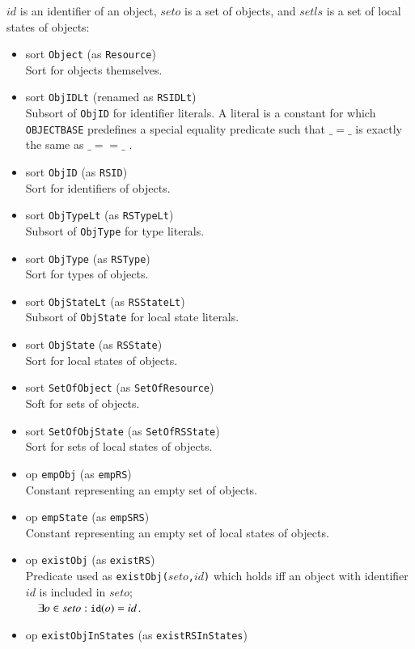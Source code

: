 \documentclass[12pt]{report}
\newcommand{\mbstt}[1]{\mbox{\small{\tt {#1}}}}
\newcommand{\stt}[1]{{\small{\tt {#1}}}}
\begin{document}
$id$ is an identifier of an object, $seto$ is a set of objects, and
$setls$ is a set of local states of objects:
\begin{itemize}
\item sort \stt{Object} (as \stt{Resource})\\
  Sort for objects themselves.
\item sort \stt{ObjIDLt} (renamed as \stt{RSIDLt})\\
  Subsort of {\tt ObjID} for identifier literals. A literal is a
  constant for which {\tt OBJECTBASE} predefines a special equality
  predicate such that $\_ = \_$ is exactly the same as $\_ == \_ $ .
\item sort \stt{ObjID} (as \stt{RSID})\\
  Sort for identifiers of objects.
\item sort \stt{ObjTypeLt} (as \stt{RSTypeLt})\\
  Subsort of {\tt ObjType} for type literals.
\item sort \stt{ObjType} (as \stt{RSType})\\
  Sort for types of objects.
\item sort \stt{ObjStateLt} (as \stt{RSStateLt})\\
  Subsort of {\tt ObjState} for local state literals.
\item sort \stt{ObjState} (as \stt{RSState})\\
  Sort for local states of objects.
\item sort \stt{SetOfObject} (as \stt{SetOfResource})\\
  Soft for sets of objects.
\item sort \stt{SetOfObjState} (as \stt{SetOfRSState})\\
  Sort for sets of local states of objects.
\item op \stt{empObj} (as \stt{empRS})\\
  Constant representing an empty set of objects.
\item op \stt{empState} (as \stt{empSRS})\\
  Constant representing an empty set of local states of objects.
\item op \stt{existObj} (as \stt{existRS})\\ 
  Predicate used as \stt{existObj($seto$,$id$)} which holds iff an
  object with identifier $id$ is included in $seto$;\\$~~~~\exists o\in
  seto: \mbstt{id}(o)=id$.
\item op \stt{existObjInStates} (as \stt{existRSInStates})\\

\end{itemize}
\end{document}
